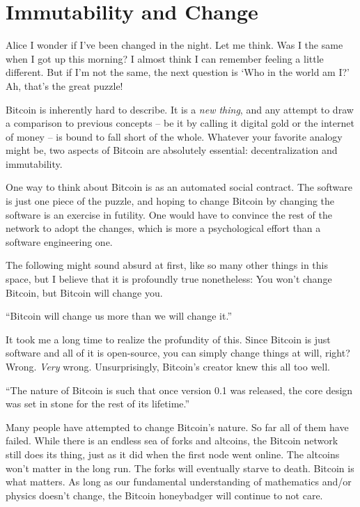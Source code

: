 \chapter{ Immutability and Change}
\label{les:1}

\begin{chapquote}{Alice}
I wonder if I've been changed in the night. Let me think. Was I the same when I
got up this morning? I almost think I can remember feeling a little different.
But if I'm not the same, the next question is `Who in the world am I?' Ah,
that's the great puzzle!
\end{chapquote}

Bitcoin is inherently hard to describe. It is a \textit{new thing}, and any
attempt to draw a comparison to previous concepts -- be it by calling
it digital gold or the internet of money -- is bound to fall short of
the whole. Whatever your favorite analogy might be, two aspects of
Bitcoin are absolutely essential: decentralization and immutability.

One way to think about Bitcoin is as an automated social
contract.\cite{social-contract} The software is just one piece of the puzzle,
and hoping to change Bitcoin by changing the software is an exercise in
futility. One would have to convince the rest of the network to adopt the
changes, which is more a psychological effort than a software engineering one.

The following might sound absurd at first, like so many other things in
this space, but I believe that it is profoundly true nonetheless: You
won't change Bitcoin, but Bitcoin will change you.

\begin{chapquote}{\cite{tftc21}}
``Bitcoin will change us more than we will change it.''
\end{chapquote}

It took me a long time to realize the profundity of this. Since Bitcoin
is just software and all of it is open-source, you can simply change
things at will, right? Wrong. \textit{Very} wrong. Unsurprisingly, Bitcoin's
creator knew this all too well.

\begin{chapquote}{\cite{satoshi-set-in-stone}}
``The nature of Bitcoin is such that once version 0.1 was released, the core
design was set in stone for the rest of its
lifetime.''
\end{chapquote}

Many people have attempted to change Bitcoin's nature. So far all of
them have failed. While there is an endless sea of forks and altcoins,
the Bitcoin network still does its thing, just as it did when the first
node went online. The altcoins won't matter in the long run. The forks
will eventually starve to death. Bitcoin is what matters. As long as our
fundamental understanding of mathematics and/or physics doesn't change,
the Bitcoin honeybadger will continue to not care.

